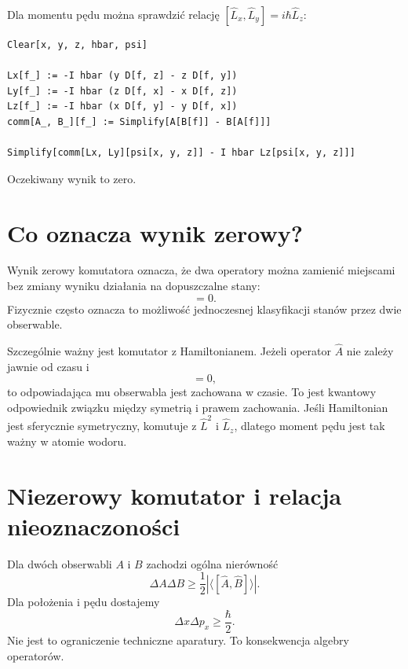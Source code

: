 Dla momentu pędu można sprawdzić relację \([\hat{L}_x,\hat{L}_y]=i\hbar\hat{L}_z\):
\begin{verbatim}
Clear[x, y, z, hbar, psi]

Lx[f_] := -I hbar (y D[f, z] - z D[f, y])
Ly[f_] := -I hbar (z D[f, x] - x D[f, z])
Lz[f_] := -I hbar (x D[f, y] - y D[f, x])
comm[A_, B_][f_] := Simplify[A[B[f]] - B[A[f]]]

Simplify[comm[Lx, Ly][psi[x, y, z]] - I hbar Lz[psi[x, y, z]]]
\end{verbatim}
Oczekiwany wynik to zero.

\section{Co oznacza wynik zerowy?}

Wynik zerowy komutatora oznacza, że dwa operatory można zamienić miejscami bez zmiany wyniku działania na dopuszczalne stany:
\begin{equation}
    [\hat{A},\hat{B}]=0.
\end{equation}
Fizycznie często oznacza to możliwość jednoczesnej klasyfikacji stanów przez dwie obserwable.

Szczególnie ważny jest komutator z Hamiltonianem. Jeżeli operator \(\hat{A}\) nie zależy jawnie od czasu i
\begin{equation}
    [\hat{H},\hat{A}]=0,
\end{equation}
to odpowiadająca mu obserwabla jest zachowana w czasie. To jest kwantowy odpowiednik związku między symetrią i prawem zachowania. Jeśli Hamiltonian jest sferycznie symetryczny, komutuje z \(\hat{L}^2\) i \(\hat{L}_z\), dlatego moment pędu jest tak ważny w atomie wodoru.

\section{Niezerowy komutator i relacja nieoznaczoności}

Dla dwóch obserwabli \(A\) i \(B\) zachodzi ogólna nierówność
\begin{equation}
    \Delta A\Delta B
    \geq
    \frac{1}{2}\left|\langle[\hat{A},\hat{B}]\rangle\right|.
\end{equation}
Dla położenia i pędu dostajemy
\begin{equation}
    \Delta x\Delta p_x\geq\frac{\hbar}{2}.
\end{equation}
Nie jest to ograniczenie techniczne aparatury. To konsekwencja algebry operatorów.

